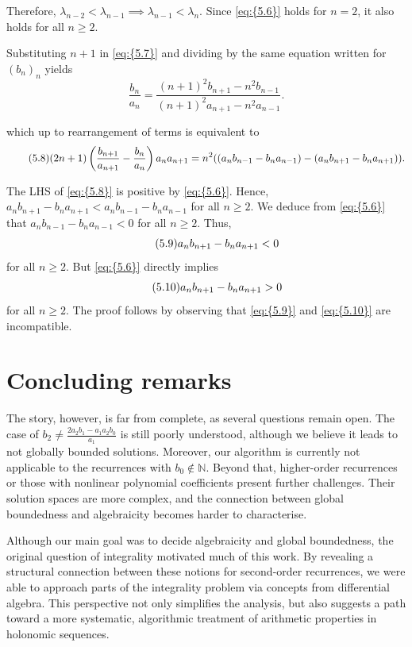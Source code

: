 \documentclass[11pt]{article}
\theoremstyle{definition}
\theoremstyle{plain}
\theoremstyle{remark}
\begin{document}
Therefore, $\lambda_{n-2} < \lambda_{n-1} \implies \lambda_{n-1} < \lambda_n$.  
Since \eqref{eq:{5.6}} holds for $n = 2$, it also holds for all $n \geq 2$. 

Substituting $n+1$ in \eqref{eq:{5.7}} and dividing by the same equation written for $(b_n)_n$ yields
\[
\frac{b_n}{a_n} = \frac{(n+1)^2 b_{n+1} - n^2 b_{n-1}}{(n+1)^2 a_{n+1} - n^2 a_{n-1}}.
\]

which up to rearrangement of terms is equivalent to
\begin{equation}\label{eq:{5.8}}\tag{5.8}
(2n + 1) \left( \frac{b_{n+1}}{a_{n+1}} - \frac{b_n}{a_n} \right) a_n a_{n+1}
= n^2 ((a_n b_{n-1} - b_n a_{n-1}) -  (a_n b_{n+1} - b_n a_{n+1})).
\end{equation}

The LHS of \eqref{eq:{5.8}} is positive by \eqref{eq:{5.6}}. Hence, $a_n b_{n+1} - b_n a_{n+1} < a_n b_{n-1} - b_n a_{n-1}$ for all $n \geq 2$.
We deduce from \eqref{eq:{5.6}} that $a_n b_{n-1} - b_n a_{n-1} < 0$ for all $n \geq 2$. Thus,
\begin{equation}\label{eq:{5.9}}\tag{5.9}
a_n b_{n+1} - b_n a_{n+1} < 0 
\end{equation}
for all $n \geq 2$.
But \eqref{eq:{5.6}} directly implies
\begin{equation}\label{eq:{5.10}}\tag{5.10}
a_n b_{n+1} - b_n a_{n+1} > 0
\end{equation}
for all $n \geq 2$. 
The proof follows by observing that \eqref{eq:{5.9}} and \eqref{eq:{5.10}} are incompatible.


\section{Concluding remarks} 
The story, however, is far from complete, as several questions remain open. The case of $b_2 \neq \frac{2a_2b_1-a_1a_2b_0}{a_1}$ is still poorly understood, although we believe it leads to not globally bounded solutions. Moreover, our algorithm is currently not applicable to the recurrences with $b_0 \notin \mathbb{N}$. Beyond that, higher-order recurrences or those with nonlinear polynomial coefficients present further challenges. Their solution spaces are more complex, and the connection between global boundedness and algebraicity becomes harder to characterise.

Although our main goal was to decide algebraicity and global boundedness, the original question of integrality motivated much of this work. By revealing a structural connection between these notions for second-order recurrences, we were able to approach parts of the integrality problem via concepts from differential algebra. This perspective not only simplifies the analysis, but also suggests a path toward a more systematic, algorithmic treatment of arithmetic properties in holonomic sequences.



\end{document}
